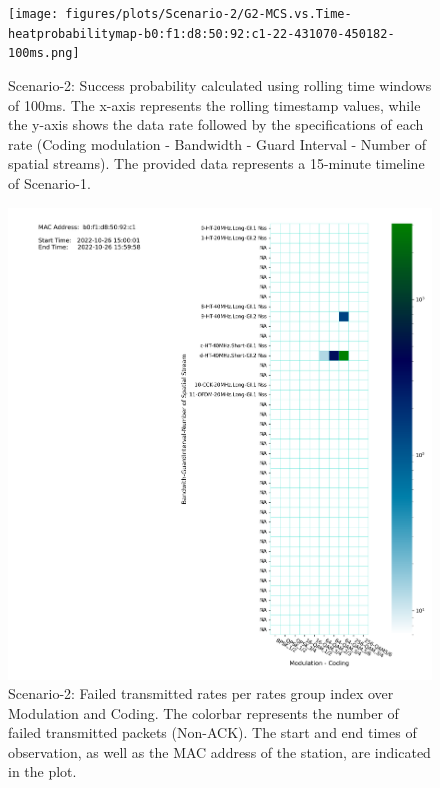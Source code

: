 \begin{landscape}
\begin{figure}[hbt!]
  \centering
  \texttt{[image: figures/plots/Scenario-2/G2-MCS.vs.Time-heatprobabilitymap-b0:f1:d8:50:92:c1-22-431070-450182-100ms.png]}
  \caption[Rate-Based Transmission Success Analysis with Rolling Time Averages]{Scenario-2: Success probability calculated using rolling time windows of 100ms. The x-axis represents the rolling timestamp values, while the y-axis shows the data rate followed by the specifications of each rate (Coding modulation - Bandwidth - Guard Interval - Number of spatial streams). The provided data represents a 15-minute timeline of Scenario-1.}
  \label{fig:Rolling-Success2}
\end{figure}
\FloatBarrier 
\end{landscape}

\begin{figure}[hbt!]
  \centering
  \includegraphics[width=\textwidth]{figures/plots/Scenario-2/G2-coldmap-b0:f1:d8:50:92:c1-22-431070-450182.png}
  \caption[Rate-Based Packet Failure Analysis]{Scenario-2: Failed transmitted rates per rates group index over Modulation and Coding. The colorbar represents the number of failed transmitted packets (Non-ACK). The start and end times of observation, as well as the MAC address of the station, are indicated in the plot.}
  \label{fig:Fail-count2}
\end{figure}
\FloatBarrier 

